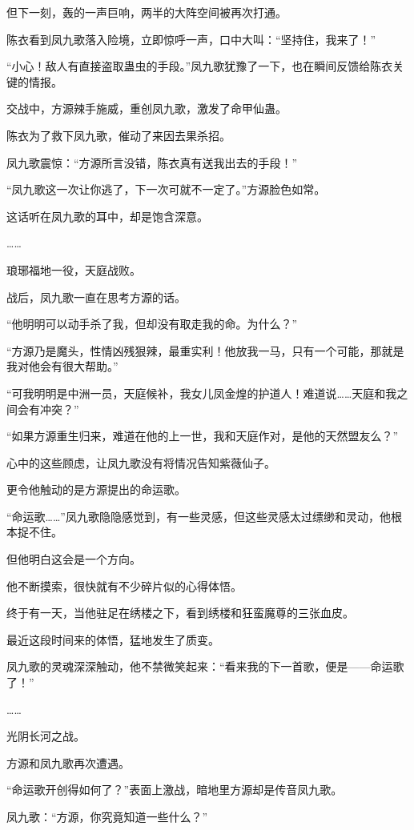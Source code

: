 \begin{this_body}
但下一刻，轰的一声巨响，两半的大阵空间被再次打通。

陈衣看到凤九歌落入险境，立即惊呼一声，口中大叫：“坚持住，我来了！”

“小心！敌人有直接盗取蛊虫的手段。”凤九歌犹豫了一下，也在瞬间反馈给陈衣关键的情报。

交战中，方源辣手施威，重创凤九歌，激发了命甲仙蛊。

陈衣为了救下凤九歌，催动了来因去果杀招。

凤九歌震惊：“方源所言没错，陈衣真有送我出去的手段！”

“凤九歌这一次让你逃了，下一次可就不一定了。”方源脸色如常。

这话听在凤九歌的耳中，却是饱含深意。

……

琅琊福地一役，天庭战败。

战后，凤九歌一直在思考方源的话。

“他明明可以动手杀了我，但却没有取走我的命。为什么？”

“方源乃是魔头，性情凶残狠辣，最重实利！他放我一马，只有一个可能，那就是我对他会有很大帮助。”

“可我明明是中洲一员，天庭候补，我女儿凤金煌的护道人！难道说……天庭和我之间会有冲突？”

“如果方源重生归来，难道在他的上一世，我和天庭作对，是他的天然盟友么？”

心中的这些顾虑，让凤九歌没有将情况告知紫薇仙子。

更令他触动的是方源提出的命运歌。

“命运歌……”凤九歌隐隐感觉到，有一些灵感，但这些灵感太过缥缈和灵动，他根本捉不住。

但他明白这会是一个方向。

他不断摸索，很快就有不少碎片似的心得体悟。

终于有一天，当他驻足在绣楼之下，看到绣楼和狂蛮魔尊的三张血皮。

最近这段时间来的体悟，猛地发生了质变。

凤九歌的灵魂深深触动，他不禁微笑起来：“看来我的下一首歌，便是——命运歌了！”

……

光阴长河之战。

方源和凤九歌再次遭遇。

“命运歌开创得如何了？”表面上激战，暗地里方源却是传音凤九歌。

凤九歌：“方源，你究竟知道一些什么？”


\end{this_body}
